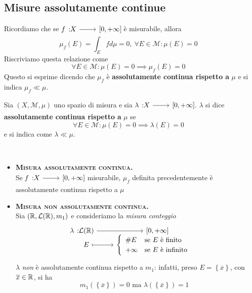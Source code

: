 \subsection{Misure assolutamente continue}
Ricordiamo che se $\funz{f}{X}{\left[0,+\infty\right]}$ è misurabile, allora
\begin{equation*}
		\mu_f\left(E\right)=\int_Efd\mu=0,\ \forall E\in\mathcal{M}\colon \mu\left(E\right)=0
\end{equation*}
Riscriviamo questa relazione come
\begin{equation*}
	\forall E\in\mathcal{M}\colon\mu\left(E\right)=0\implies \mu_f\left(E\right)=0
\end{equation*}
Questo si esprime dicendo che $\mu_f$ è \textbf{assolutamente continua rispetto a} $\mu$ e si indica $\mu_f \ll \mu$.
\begin{define}
	Sia $\left(X,\mathcal{M},\mu\right)$ uno spazio di misura e sia $\funz{\lambda}{X}{\left[0,+\infty\right]}$. $\lambda$ si dice \textbf{assolutamente continua rispetto a }$\mu$ se
	\begin{equation}
		\forall E\in\mathcal{M}\colon \mu\left(E\right)=0\implies \lambda\left(E\right)=0
	\end{equation}
e si indica come $\lambda \ll \mu$.
\end{define}
\begin{examples}~{}
	\begin{itemize}
		\item \textsc{\textbf{Misura assolutamente continua.}}\\
		Se $\funz{f}{X}{\left[0,+\infty\right]}$ misurabile, $\mu_f$ definita precedentemente è assolutamente continua rispetto a $\mu$
		\item \textsc{\textbf{Misura non assolutamente continua.}}\\
		Sia $\left(\mathbb{R},\mathcal{L}(\mathbb{R}),m_1\right)$ e consideriamo la \textit{misura conteggio}
		\begin{equation*}
			\funztot{\lambda}{\mathcal{L}(\realset)}{\left[0,+\infty\right]}{E}{\begin{cases}
					\begin{array}{ll}
						\# E&\text{se }E\text{ è finito}\\
						+\infty&\text{se }E\text{ è infinito}
					\end{array}
			\end{cases}}
		\end{equation*}
		$\lambda$ \textit{non} è assolutamente continua rispetto a $m_1$: infatti, preso $E=\left\{\overline{x}\right\}$, con $\overline{x}\in\mathbb{R}$, si ha
		\begin{equation*}
			m_1\left(\left\{\overline{x}\right\}\right)=0\text{ ma }\lambda\left(\left\{\overline{x}\right\}\right)=1
		\end{equation*}
	\end{itemize}
\end{examples}
